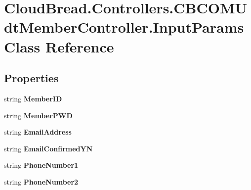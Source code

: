 \hypertarget{a00097}{}\section{Cloud\+Bread.\+Controllers.\+C\+B\+C\+O\+M\+Udt\+Member\+Controller.\+Input\+Params Class Reference}
\label{a00097}
\subsection*{Properties}
\begin{DoxyCompactItemize}
\item 
string {\bfseries Member\+ID}\hypertarget{a00097_a0adec4b59646ca3c4151fb2f3d30ea4e}{}\label{a00097_a0adec4b59646ca3c4151fb2f3d30ea4e}

\item 
string {\bfseries Member\+P\+WD}\hypertarget{a00097_a4704abfb386af61b2c81f71281cef35a}{}\label{a00097_a4704abfb386af61b2c81f71281cef35a}

\item 
string {\bfseries Email\+Address}\hypertarget{a00097_a7620c76a3069913dde3cc2edf32d8eb7}{}\label{a00097_a7620c76a3069913dde3cc2edf32d8eb7}

\item 
string {\bfseries Email\+Confirmed\+YN}\hypertarget{a00097_a9ef0d983af47a17bf85ca05566fd1da1}{}\label{a00097_a9ef0d983af47a17bf85ca05566fd1da1}

\item 
string {\bfseries Phone\+Number1}\hypertarget{a00097_a41ea7e1b3b7b61ad6fc5c9053f3d176c}{}\label{a00097_a41ea7e1b3b7b61ad6fc5c9053f3d176c}

\item 
string {\bfseries Phone\+Number2}\hypertarget{a00097_a7cbe61d97d9de1c535684fe9577ac5d9}{}\label{a00097_a7cbe61d97d9de1c535684fe9577ac5d9}


\end{DoxyCompactItemize}
